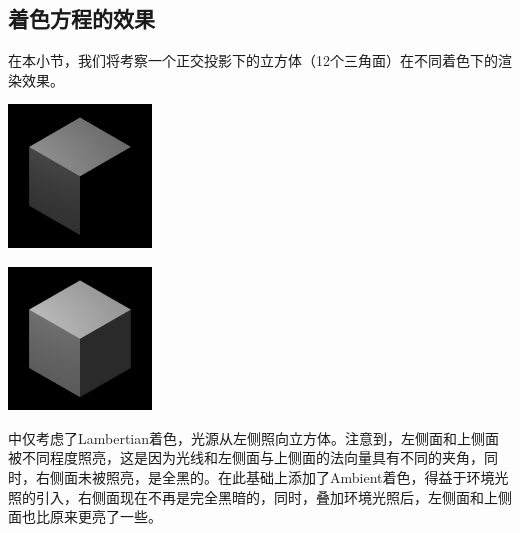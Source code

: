 \subsection{着色方程的效果}
在本小节，我们将考察一个正交投影下的立方体（12个三角面）在不同着色下的渲染效果。
\begin{Figure}[Lambertian着色和Ambient着色]
    \begin{FigureSub}[Lambertian着色]
        \includegraphics[width=3.8cm]{image/Cube/Cube1.jpg}
    \end{FigureSub}
    \hspace{0.5cm}
    \begin{FigureSub}[Ambient着色]
        \includegraphics[width=3.8cm]{image/Cube/Cube2.jpg}
    \end{FigureSub}
\end{Figure}
中仅考虑了Lambertian着色，光源从左侧照向立方体。注意到，左侧面和上侧面被不同程度照亮，这是因为光线和左侧面与上侧面的法向量具有不同的夹角，同时，右侧面未被照亮，是全黑的。在此基础上添加了Ambient着色，得益于环境光照的引入，右侧面现在不再是完全黑暗的，同时，叠加环境光照后，左侧面和上侧面也比原来更亮了一些。

